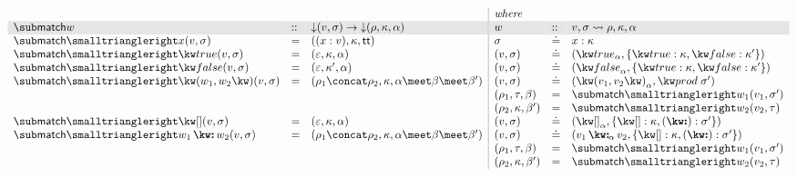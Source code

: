 $\begin{array}{lll|lll}
   \arrayrulecolor{lightgray}
   &&&\textit{where}
   \\
   \rowcolor{verylightgray}
   \matchFwdGC{w} &::& \Below{(v,\sigma)} \to \Below{(\rho,\kappa, \alpha)}
   &w &::& v, \sigma \match \rho, \kappa, \alpha
   \\
   \matchFwdF{x}(v, \sigma)
   &=&
   (\bind{x}{v}, \kappa, \TT)
   &
   \sigma &\eq& \elimVar{x}{\kappa}
   \\
   \matchFwdF{\matchTrue}(v, \sigma)
   &=&
   (\seqEmpty, \kappa, \alpha)
   &
   (v, \sigma) &\eq& (\annTrue{\alpha}, \elimBool{\kappa}{\kappa'})
   \\
   \matchFwdF{\matchFalse}(v, \sigma)
   &=&
   (\seqEmpty, \kappa', \alpha)
   &
   (v, \sigma) &\eq& (\annFalse{\alpha}, \elimBool{\kappa}{\kappa'})
   \\
   \matchFwdF{\matchPair{w_1}{w_2}}(v, \sigma)
   &=&
   (\rho_1 \concat \rho_2, \kappa, \alpha \meet \beta \meet \beta')
   &
   (v, \sigma) &\eq& (\annPair{v_1}{v_2}{\alpha}, \elimProd{\sigma'})
   \\
   &&&
   (\rho_1, \tau, \beta) &=& \matchFwdF{w_1}(v_1,\sigma')
   \\
   &&&
   (\rho_2, \kappa, \beta') &=& \matchFwdF{w_2}(v_2,\tau)
   \\
   \matchFwdF{\matchNil}(v, \sigma)
   &=&
   (\seqEmpty, \kappa, \alpha)
   &
   (v, \sigma) &\eq& (\annNil{\alpha}, \elimList{\kappa}{\sigma'})
   \\
   \matchFwdF{\matchCons{w_1}{w_2}}(v, \sigma)
   &=&
   (\rho_1 \concat \rho_2, \kappa, \alpha \meet \beta \meet \beta')
   &
   (v, \sigma) &\eq& (\annCons{v_1}{v_2}{\alpha}, \elimList{\kappa}{\sigma'})
   \\
   &&&
   (\rho_1, \tau, \beta) &=& \matchFwdF{w_1}(v_1,\sigma')
   \\
   &&&
   (\rho_2, \kappa, \beta') &=& \matchFwdF{w_2}(v_2,\tau)
\end{array}$\\
